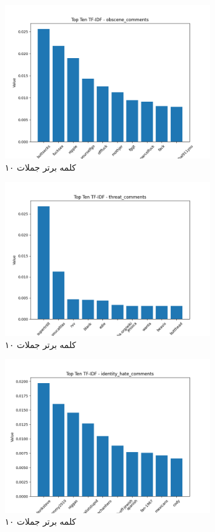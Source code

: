 \begin{figure}
  \centering
  \includegraphics[width=0.8\textwidth]{stats/top_ten_TF-IDF_obscene_comments.png}
  \caption{۱۰ کلمه برتر جملات }
  \label{fig:unique_common_words_total}
\end{figure}

\begin{figure}
  \centering
  \includegraphics[width=0.8\textwidth]{stats/top_ten_TF-IDF_threat_comments.png}
  \caption{۱۰ کلمه برتر جملات }
  \label{fig:unique_uncommon_words_count}
\end{figure}

\begin{figure}
  \centering
  \includegraphics[width=0.8\textwidth]{stats/top_ten_TF-IDF_identity_hate_comments.png}
  \caption{۱۰ کلمه برتر جملات }
  \label{fig:unique_uncommon_words_count}
\end{figure}

